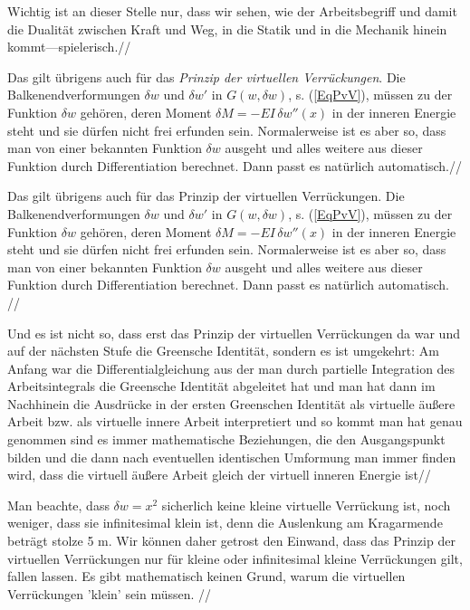 Wichtig ist an dieser Stelle nur, dass wir sehen, wie der Arbeitsbegriff und damit die Dualit\"{a}t zwischen Kraft und Weg, in die Statik und in die Mechanik hinein kommt---spielerisch.//

Das gilt \"{u}brigens auch f\"{u}r das {\em Prinzip der virtuellen Verr\"{u}ckungen\/}. Die Balkenendverformungen $\delta w$ und $\delta w'$ in $G(w,\delta w)$, s. (\ref{EqPvV}), m\"{u}ssen zu der Funktion $\delta w$ geh\"{o}ren, deren Moment $\delta M = - EI \,\delta w''(x)$ in der inneren Energie steht und sie d\"{u}rfen nicht frei erfunden sein. Normalerweise ist es aber so, dass man von einer bekannten Funktion $\delta w$ ausgeht und alles weitere aus dieser Funktion durch Differentiation berechnet. Dann passt es nat\"{u}rlich automatisch.//

Das gilt \"{u}brigens auch f\"{u}r das Prinzip der virtuellen Verr\"{u}ckungen. Die Balkenendverformungen $\delta w$ und $\delta w'$ in $G(w,\delta w)$, s. (\ref{EqPvV}), m\"{u}ssen zu der Funktion $\delta w$ geh\"{o}ren, deren Moment $\delta M = - EI \,\delta w''(x)$ in der inneren Energie steht und sie d\"{u}rfen nicht frei erfunden sein. Normalerweise ist es aber so, dass man von einer bekannten Funktion $\delta w$ ausgeht und alles weitere aus dieser Funktion durch Differentiation berechnet. Dann passt es nat\"{u}rlich automatisch. //

Und es ist nicht so, dass erst das Prinzip der virtuellen Verr\"{u}ckungen da war und auf der n\"{a}chsten Stufe die Greensche Identit\"{a}t, sondern es ist umgekehrt: Am Anfang war die Differentialgleichung aus der man durch partielle Integration des Arbeitsintegrals die Greensche Identit\"{a}t abgeleitet hat und man hat dann im Nachhinein die Ausdr\"{u}cke in der ersten Greenschen Identit\"{a}t als virtuelle \"{a}u{\ss}ere Arbeit bzw. als virtuelle innere Arbeit interpretiert und so kommt man hat
genau genommen sind es immer mathematische Beziehungen, die den Ausgangspunkt bilden und die dann nach eventuellen identischen Umformung
man immer finden wird, dass die virtuell \"{a}u{\ss}ere Arbeit gleich der virtuell inneren Energie ist//

Man beachte, dass $\delta w = x^2 $ sicherlich keine kleine virtuelle Verr\"{u}ckung ist, noch weniger, dass sie infinitesimal klein ist, denn die Auslenkung am Kragarmende betr\"{a}gt stolze 5 m. Wir k\"{o}nnen daher getrost den Einwand, dass das Prinzip der virtuellen Verr\"{u}ckungen nur f\"{u}r kleine oder infinitesimal kleine Verr\"{u}ckungen gilt, fallen lassen.
Es gibt mathematisch keinen Grund, warum die virtuellen Verr\"{u}ckungen 'klein' sein m\"{u}ssen.
//

